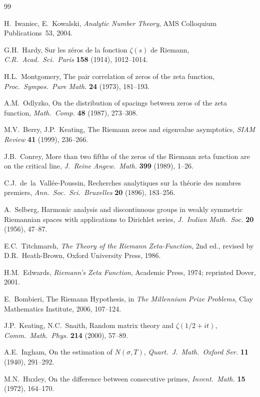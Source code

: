 \documentclass[11pt]{article}
\theoremstyle{remark}
\begin{document}
\begin{thebibliography}{99}

  H.~Iwaniec, E.~Kowalski,
  \textit{Analytic Number Theory},
  AMS Colloquium Publications~53, 2004.

  G.H.~Hardy,
  Sur les z\'eros de la fonction $\zeta(s)$ de Riemann,
  \textit{C.R.\ Acad.\ Sci.\ Paris} \textbf{158} (1914), 1012--1014.

  H.L.~Montgomery,
  The pair correlation of zeros of the zeta function,
  \textit{Proc.\ Sympos.\ Pure Math.} \textbf{24} (1973), 181--193.

  A.M.~Odlyzko,
  On the distribution of spacings between zeros of the zeta function,
  \textit{Math.\ Comp.} \textbf{48} (1987), 273--308.

  M.V.~Berry, J.P.~Keating,
  The Riemann zeros and eigenvalue asymptotics,
  \textit{SIAM Review} \textbf{41} (1999), 236--266.

  J.B.~Conrey,
  More than two fifths of the zeros of the Riemann zeta function are on the
  critical line,
  \textit{J.\ Reine Angew.\ Math.} \textbf{399} (1989), 1--26.

  C.J.~de~la~Vall\'ee-Poussin,
  Recherches analytiques sur la th\'eorie des nombres premiers,
  \textit{Ann.\ Soc.\ Sci.\ Bruxelles} \textbf{20} (1896), 183--256.

  A.~Selberg,
  Harmonic analysis and discontinuous groups in weakly symmetric Riemannian
  spaces with applications to Dirichlet series,
  \textit{J.\ Indian Math.\ Soc.} \textbf{20} (1956), 47--87.

  E.C.~Titchmarsh,
  \textit{The Theory of the Riemann Zeta-Function},
  2nd ed., revised by D.R.~Heath-Brown, Oxford University Press, 1986.

  H.M.~Edwards,
  \textit{Riemann's Zeta Function},
  Academic Press, 1974; reprinted Dover, 2001.

  E.~Bombieri,
  The Riemann Hypothesis,
  in \textit{The Millennium Prize Problems}, Clay Mathematics Institute, 2006,
  107--124.

  J.P.~Keating, N.C.~Snaith,
  Random matrix theory and $\zeta(1/2+it)$,
  \textit{Comm.\ Math.\ Phys.} \textbf{214} (2000), 57--89.

  A.E.~Ingham,
  On the estimation of $N(\sigma, T)$,
  \textit{Quart.\ J.\ Math.\ Oxford Ser.} \textbf{11} (1940), 291--292.

  M.N.~Huxley,
  On the difference between consecutive primes,
  \textit{Invent.\ Math.} \textbf{15} (1972), 164--170.

\end{thebibliography}
\end{document}
